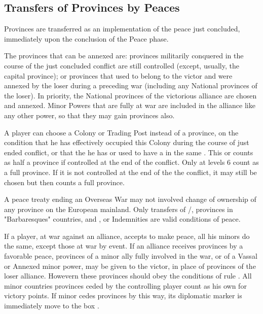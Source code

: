 \subsection{Transfers of Provinces by Peaces}\label{chSpecific:Tranfer
  Provinces Peace}

\aparag Provinces are transferred as an implementation of the peace just
concluded, immediately upon the conclusion of the Peace phase.

The provinces that can be annexed are:
\bparag provinces militarily conquered in the course of the just concluded
conflict are still controlled (except, usually, the capital province);
\bparag or provinces that used to belong to the victor and were annexed by the
loser during a preceding war (including any National provinces of the loser).
\bparag In priority, the National provinces of the victorious alliance are
chosen and annexed.
\bparag Minor Powers that are fully at war are included in the alliance like
any other power, so that they may gain provinces also.

A player can choose a Colony or Trading Post instead of a province, on the
condition that he has effectively occupied this Colony during the course of
just ended conflict, or that the he has or used to have a \COL in the same
.
\bparag This \COL or \TP counts as half a province if controlled at the end of
the conflict.  Only \COL at levels 6 count as a full province.
\bparag If it is not controlled at the end of the the conflict, it may still
be chosen but then counts a full province.

A peace treaty ending an Overseas War may not involved change of ownership of
any province on the European mainland. Only transfers of \TP/\COL, provinces
in "Barbaresques" countries,  and , or Indemnities are
valid conditions of peace.

If a player, at war against an alliance, accepts to make peace, all his minors
do the same, except those at war by event.
\bparag If an alliance receives provinces by a favorable peace, provinces of a
minor ally fully involved in the war, or of a Vassal or Annexed minor power,
may be given to the victor, in place of provinces of the loser
alliance. Howevern these provinces should obey the conditions of rule
.
\bparag All minor countries provinces ceded by the controlling player count as
his own for victory points.
\bparag If minor cedes provinces by this way, its diplomatic marker is
immediately move to the box \Neutral.



